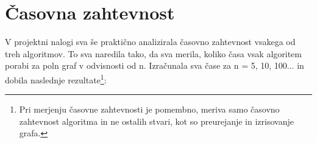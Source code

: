 \documentclass[12pt, a4paper]{article}
\begin{document}
%    
%    

\newpage

\section[Časovna zahtevnost]{Časovna zahtevnost}
V projektni nalogi sva še praktično analizirala časovno zahtevnost vsakega od treh algoritmov. To sva naredila tako, da sva merila, koliko časa vsak algoritem porabi za poln graf v odvisnosti od n. Izračunala sva čase za n = 5, 10, 100... in dobila naslednje rezultate\footnote{Pri merjenju časovne zahtevnosti je pomembno, meriva samo časovno zahtevnost algoritma in ne ostalih stvari, kot so preurejanje in izrisovanje grafa.}:
\end{document}
